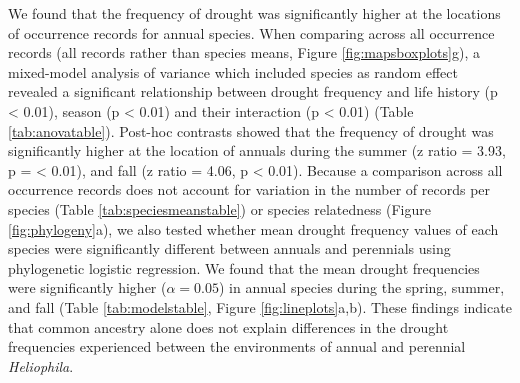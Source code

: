 \documentclass[man,floatsintext]{apa6}
\theoremstyle{definition}
\theoremstyle{definition}
\theoremstyle{definition}
\theoremstyle{remark}
\begin{document}
We found that the frequency of drought was significantly higher at the
locations of occurrence records for annual species. When comparing
across all occurrence records (all records rather than species means,
Figure \ref{fig:mapsboxplots}g), a mixed-model analysis of variance
which included species as random effect revealed a significant
relationship between drought frequency and life history (p \textless{}
0.01), season (p \textless{} 0.01) and their interaction (p \textless{}
0.01) (Table \ref{tab:anovatable}). Post-hoc contrasts showed that the
frequency of drought was significantly higher at the location of annuals
during the summer (z ratio = 3.93, p = \textless{} 0.01), and fall (z
ratio = 4.06, p \textless{} 0.01). Because a comparison across all
occurrence records does not account for variation in the number of
records per species (Table \ref{tab:speciesmeanstable}) or species
relatedness (Figure \ref{fig:phylogeny}a), we also tested whether mean
drought frequency values of each species were significantly different
between annuals and perennials using phylogenetic logistic regression.
We found that the mean drought frequencies were significantly higher
(\(\alpha = 0.05\)) in annual species during the spring, summer, and
fall (Table \ref{tab:modelstable}, Figure \ref{fig:lineplots}a,b). These
findings indicate that common ancestry alone does not explain
differences in the drought frequencies experienced between the
environments of annual and perennial \emph{Heliophila}.
\end{document}
